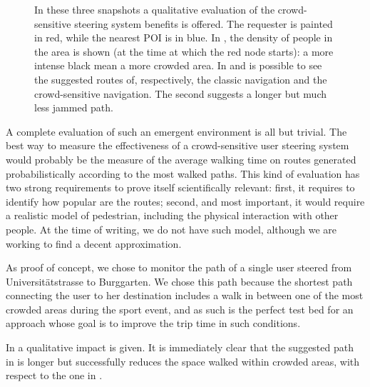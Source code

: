 \documentclass[12pt,a4paper,twoside,openright]{book}
\begin{document}
\begin{figure}
{   \label{img:ahpc-crowdsteering}
  }
 \caption[Crowd sensitive steering in Vienna]{In these three snapshots a qualitative evaluation of the crowd-sensitive steering system benefits is offered. The requester is painted in red, while the nearest POI is in blue. In , the density of people in the area is shown (at the time at which the red node starts): a more intense black mean a more crowded area. In  and  is possible to see the suggested routes of, respectively, the classic navigation and the crowd-sensitive navigation. The second suggests a longer but much less jammed path.}
 \label{img:ahpc-steering}
\end{figure}

A complete evaluation of such an emergent environment is all but trivial.
%
The best way to measure the effectiveness of a crowd-sensitive user steering system would probably be the measure of the average walking time on routes generated probabilistically according to the most walked paths.
%
This kind of evaluation has two strong requirements to prove itself scientifically relevant: first, it requires to identify how popular are the routes; second, and most important, it would require a realistic model of pedestrian, including the physical interaction with other people.
%
At the time of writing, we do not have such model, although we are working to find a decent approximation.

As proof of concept, we chose to monitor the path of a single user steered from Universit\"{a}tstrasse to Burggarten.
%
We chose this path because the shortest path connecting the user to her destination includes a walk in between one of the most crowded areas during the sport event, and as such is the perfect test bed for an approach whose goal is to improve the trip time in such conditions.

In  a qualitative impact is given.
%
It is immediately clear that the suggested path in  is longer but successfully reduces the space walked within crowded areas, with respect to the one in .
\end{document}
